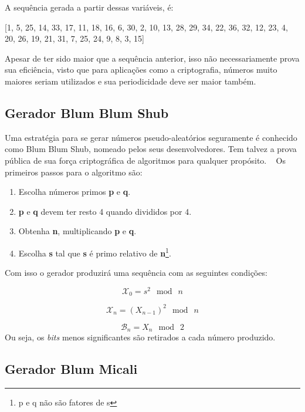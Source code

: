 A sequência gerada a partir dessas variáveis, é:

[1, 5, 25, 14, 33, 17, 11, 18, 16, 6, 30, 2, 10, 13, 28, 29, 34, 22, 36, 32, 12, 23, 4, 20, 26, 19, 21, 31, 7, 25, 24, 9, 8, 3, 15]

Apesar de ter sido maior que a sequência anterior, isso não necessariamente prova sua eficiência, visto que para aplicações como a criptografia, números muito maiores seriam utilizados e sua periodicidade deve ser maior também.


\subsection{Gerador Blum Blum Shub}
Uma estratégia para se gerar números pseudo-aleatórios seguramente é conhecido como Blum Blum Shub, nomeado pelos seus desenvolvedores. Tem talvez a prova pública de sua força criptográfica de algoritmos para qualquer propósito. ~\cite{william-stallings} Os primeiros passos para o algoritmo são:

\begin{enumerate}
	\item Escolha números primos \textbf{p} e \textbf{q}.
	\item \textbf{p} e \textbf{q} devem ter resto 4 quando divididos por 4.
	\item Obtenha \textbf{n}, multiplicando \textbf{p} e \textbf{q}.
	\item Escolha \textbf{s} tal que \textbf{s} é primo relativo de \textbf{n}\footnote{p e q não são fatores de s}.
\end{enumerate}

Com isso o gerador produzirá uma sequência com as seguintes condições:

\begin{equation}
	\label{Equação para produzir a sequência}
	\mathcal{X}_0 = s^2\: \bmod \: n
\end{equation}

\begin{equation}
	\label{Equação para produzir a sequência}
	\mathcal{X}_n = (X_{n-1})^2 \: \bmod \: n
\end{equation}

\begin{equation}
	\label{Equação para produzir a sequência}
	\mathcal{B}_n = X_n \: \bmod \: 2
\end{equation}
Ou seja, os \textit{bits} menos significantes são retirados a cada número produzido.

\subsection{Gerador Blum Micali}
\label{blum-micali-generator}

